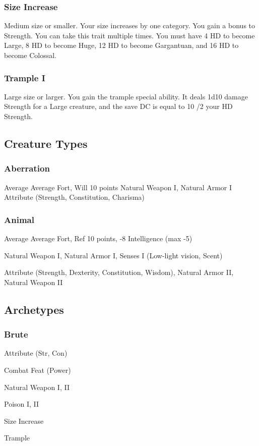 \subsubsection{Size Increase}
\featpre Medium size or smaller.
\featben Your size increases by one category. You gain a  bonus to Strength.
 You can take this trait multiple times. You must have 4 HD to become Large, 8 HD to become Huge, 12 HD to become Gargantuan, and 16 HD to become Colossal.

\subsubsection{Trample I}
\featpre Large size or larger.
\featben You gain the trample special ability. It deals 1d10 damage \add Strength for a Large creature, and the save DC is equal to 10 /2 your HD \add Strength.

\subsection{Creature Types}

\subsubsection{Aberration}
\tbab Average
\tsaves Average Fort, Will
 10 points
 Natural Weapon I, Natural Armor I
 Attribute (Strength, Constitution, Charisma)

\subsubsection{Animal}
\tbab Average
\tsaves Average Fort, Ref
 10 points, -8 Intelligence (max -5)

 Natural Weapon I, Natural Armor I, Senses I (Low-light vision, Scent)

 Attribute (Strength, Dexterity, Constitution, Wisdom), Natural Armor II, Natural Weapon II

\subsection{Archetypes}

\subsubsection{Brute}
\begin{itemize*}
    \item Attribute (Str, Con)
    \item Combat Feat (Power)
    \item Natural Weapon I, II
    \item Poison I, II
    \item Size Increase
    \item Trample
\end{itemize*}

